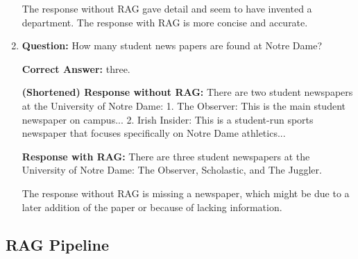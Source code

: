 \documentclass[12pt]{article}
\begin{document}
\begin{enumerate}
    The response without RAG gave detail and seem to have invented a department. The response with RAG is more concise and accurate.

    \item \textbf{Question:} How many student news papers are found at Notre Dame?
    
    \textbf{Correct Answer:} three.
    
    \textbf{(Shortened) Response without RAG:} There are two student newspapers at the University of Notre Dame: 
    1. The Observer: This is the main student newspaper on campus...
    2. Irish Insider: This is a student-run sports newspaper that focuses specifically on Notre Dame athletics...

    \textbf{Response with RAG:} There are three student newspapers at the University of Notre Dame: The Observer, Scholastic, and The Juggler.  

    The response without RAG is missing a newspaper, which might be due to a later addition of the paper or because of lacking information. 
\end{enumerate}

\subsection{RAG Pipeline}
\end{document}
